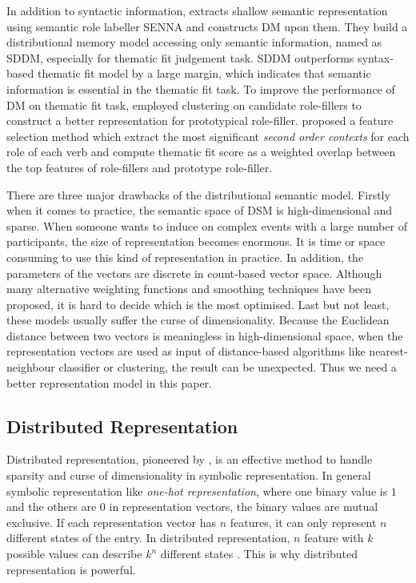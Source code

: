 \documentclass[a4paper]{article}
\begin{document}
In addition to syntactic information, \citet{sayeed2014combining} extracts shallow semantic representation using semantic role labeller SENNA and constructs DM upon them. They build a distributional memory model accessing only semantic information, named as SDDM, especially for thematic fit judgement task. SDDM outperforms syntax-based thematic fit model by a large margin, which indicates that semantic information is essential in the thematic fit task. To improve the performance of DM on thematic fit task, \citet{greenberg2015improving} employed clustering on candidate role-fillers to construct a better representation for prototypical role-filler. \citet{santus2017measuring} proposed a feature selection method which extract the most significant \textit{second order contexts} for each role of each verb and compute thematic fit score as a weighted overlap between the top features of role-fillers and prototype role-filler. 

There are three major drawbacks of the distributional semantic model. Firstly when it comes to practice, the semantic space of DSM is high-dimensional and sparse. When someone wants to induce on complex events with a large number of participants, the size of representation becomes enormous. It is time or space consuming to use this kind of representation in practice. In addition, the parameters of the vectors are discrete in count-based vector space. Although many alternative weighting functions and smoothing techniques have been proposed, it is hard to decide which is the most optimised. Last but not least, these models usually suffer the curse of dimensionality. Because the Euclidean distance between two vectors is meaningless in high-dimensional space, when the representation vectors are used as input of distance-based algorithms like nearest-neighbour classifier or clustering, the result can be unexpected. Thus we need a better representation model in this paper. 
% 
% 
% 
% 


\subsection{Distributed Representation} \label{sec:repr}
Distributed representation, pioneered by \citet{hinton1986learning}, is an effective method to handle sparsity and curse of dimensionality in symbolic representation. In general symbolic representation like \textit{one-hot representation}, where one binary value is $1$ and the others are $0$ in representation vectors, the binary values are mutual exclusive. If each representation vector has $n$ features, it can only represent $n$ different states of the entry. In distributed representation, $n$ feature with $k$ possible values can describe $k^n$ different states \citep{Goodfellow-et-al-2016}. This is why distributed representation is powerful. 
\end{document}
